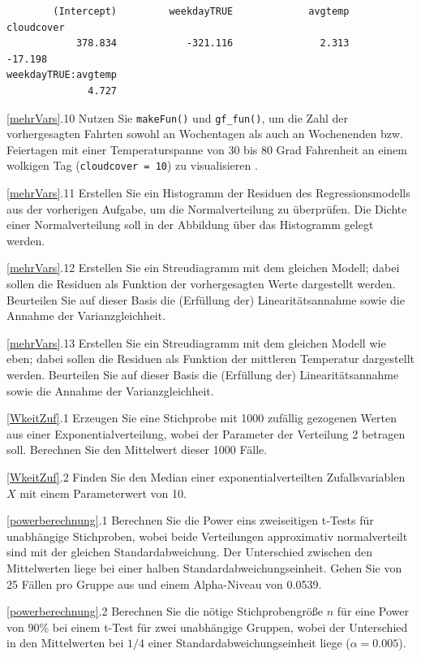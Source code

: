 \documentclass[
  ngerman,
]{scrbook}
\begin{document}
\begin{verbatim}
        (Intercept)         weekdayTRUE             avgtemp          cloudcover 
            378.834            -321.116               2.313             -17.198 
weekdayTRUE:avgtemp 
              4.727 
\end{verbatim}

\ref{mehrVars}.10 Nutzen Sie \texttt{makeFun()} und \texttt{gf\_fun()}, um die Zahl der vorhergesagten Fahrten sowohl an Wochentagen als auch an Wochenenden bzw. Feiertagen mit einer Temperaturspanne von 30 bis 80 Grad Fahrenheit an einem wolkigen Tag (\texttt{cloudcover\ =\ 10}) zu visualisieren .

\ref{mehrVars}.11 Erstellen Sie ein Histogramm der Residuen des Regressionsmodells aus der vorherigen Aufgabe, um die Normalverteilung zu überprüfen. Die Dichte einer Normalverteilung soll in der Abbildung über das Histogramm gelegt werden.

\ref{mehrVars}.12 Erstellen Sie ein Streudiagramm mit dem gleichen Modell; dabei sollen die Residuen als Funktion der vorhergesagten Werte dargestellt werden. Beurteilen Sie auf dieser Basis die (Erfüllung der) Linearitätsannahme sowie die Annahme der Varianzgleichheit.

\ref{mehrVars}.13 Erstellen Sie ein Streudiagramm mit dem gleichen Modell wie eben; dabei sollen die Residuen als Funktion der mittleren Temperatur dargestellt werden. Beurteilen Sie auf dieser Basis die (Erfüllung der) Linearitätsannahme sowie die Annahme der Varianzgleichheit.

\ref{WkeitZuf}.1 Erzeugen Sie eine Stichprobe mit 1000 zufällig gezogenen Werten aus einer Exponentialverteilung, wobei der Parameter der Verteilung 2 betragen soll. Berechnen Sie den Mittelwert dieser 1000 Fälle.

\ref{WkeitZuf}.2 Finden Sie den Median einer exponentialverteilten Zufallsvariablen \(X\) mit einem Parameterwert von 10.

\ref{powerberechnung}.1 Berechnen Sie die Power eins zweiseitigen t-Tests für unabhängige Stichproben, wobei beide Verteilungen approximativ normalverteilt sind mit der gleichen Standardabweichung. Der Unterschied zwischen den Mittelwerten liege bei einer halben Standardabweichungseinheit. Gehen Sie von 25 Fällen pro Gruppe aus und einem Alpha-Niveau von 0.0539.

\ref{powerberechnung}.2 Berechnen Sie die nötige Stichprobengröße \(n\) für eine Power von 90\% bei einem t-Test für zwei unabhängige Gruppen, wobei der Unterschied in den Mittelwerten bei \(1/4\) einer Standardabweichungseinheit liege (\(\alpha = 0.005\)).
\end{document}
